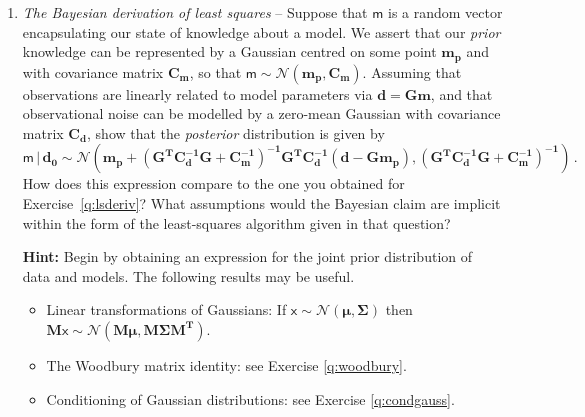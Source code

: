 \documentclass[a4paper,11pt]{article}
\newenvironment{hint}{
	\begin{mdframed}[backgroundcolor=gray!10,roundcorner=5pt]\textbf{Hint:} }{
	\end{mdframed}}
\begin{document}
\begin{enumerate}[resume]
\begin{enumerate}
\begin{hint}In any computer program it is always best to calculate $\log p(n | {\bf d})$ first and then take an exponent to evaluate the curve as a function of $n$. Stirling's formulae for the approximation to $n!$ may be useful. 
\end{hint}

  \item Repeat the problem using the Maximum Likelihood (ML) approach. This is done by finding the value of $n$ which maximises the the likelihood expression in eqn. (\ref{eq:like}). Since the prior is a constant for this problem the likelihood is proportional to the curve you  produced in part (b). You could probably do it visually. Plot the average estimate you obtained in part (a) on top of the curve from part (b). How does the ML solution compare to the solution from part (a)?

  \end{enumerate}
  
  \pagebreak
\item \textit{The Bayesian derivation of least squares} \label{q:Bayesls} --
Suppose that $\mathsf{m}$ is a random vector encapsulating our state of knowledge about a model. We assert that our \emph{prior} knowledge can be represented by a Gaussian centred on some point $\mathbf{m_p}$ and with covariance matrix $\mathbf{C_m}$, so that $\mathsf{m}\sim\mathcal{N}(\mathbf{m_p},\mathbf{C_m})$. Assuming that observations are linearly related to model parameters via $\mathbf{d}=\mathbf{Gm}$, and that observational noise can be modelled by a zero-mean Gaussian with covariance matrix $\mathbf{C_d}$, show that the \emph{posterior} distribution is given by
\[\mathsf{m}\,|\,\mathbf{d_0}\sim\mathcal{N}\left(\mathbf{m_p} + \left(\mathbf{G^TC_d^{-1}G +C_m^{-1}}\right)^\mathbf{-1}\mathbf{G^TC_d^{-1}}\left(\mathbf{d}-\mathbf{Gm_p}\right),\left(\mathbf{G^TC_d^{-1}G +C_m^{-1}}\right)^\mathbf{-1}\right)\,\mathrm{.}\]
How does this expression compare to the one you obtained for Exercise~\ref{q:lsderiv}? What assumptions would the Bayesian claim are implicit within the form of the least-squares algorithm given in that question? 
\begin{hint}
Begin by obtaining an expression for the joint prior distribution of data and models. The following results may be useful.
\begin{itemize}
\item Linear transformations of Gaussians: If $\mathsf{x}\sim\mathcal{N}\left(\boldsymbol{\mu},\boldsymbol{\Sigma}\right)$ then $\mathbf{M}\mathsf{x}\sim\mathcal{N}\left(\mathbf{M}\boldsymbol{\mu},\mathbf{M}\boldsymbol{\Sigma}\mathbf{M^T}\right)$.
\item The Woodbury matrix identity: see Exercise \ref{q:woodbury}.
\item Conditioning of Gaussian distributions: see Exercise \ref{q:condgauss}. 
\end{itemize}
\end{hint}
\end{enumerate}
\end{document}
